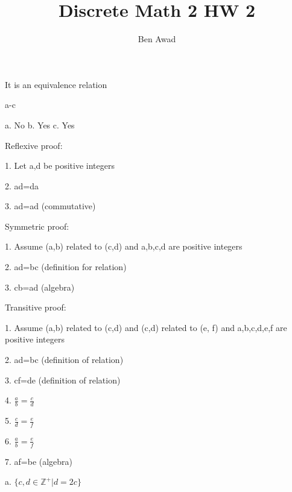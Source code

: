 \documentclass[12pt]{article}
\newenvironment{problem}[2][Problem]{\begin{trivlist}
\item[\hskip \labelsep {\bfseries #1}\hskip \labelsep {\bfseries #2.}]}{\end{trivlist}}
\begin{document}
 
 
\title{Discrete Math 2 HW 2}
\author{Ben Awad}
\maketitle
 
\begin{problem}{9.5.22}
\end{problem}
It is an equivalence relation

\begin{problem}{9.5.24}
    a-c
\end{problem}

a. No
b. Yes
c. Yes

\begin{problem}{9.5.16}
\end{problem}

Reflexive proof:

1. Let a,d be positive integers

2. ad=da

3. ad=ad (commutative)

Symmetric proof:

1. Assume (a,b) related to (c,d) and a,b,c,d are positive integers

2. ad=bc (definition for relation)

3. cb=ad (algebra)

Transitive proof:

1. Assume (a,b) related to (c,d) and (c,d) related to (e, f) and a,b,c,d,e,f are positive integers

2. ad=bc (definition of relation)

3. cf=de (definition of relation)

4. $\frac{a}{b} = \frac{c}{d}$

5. $\frac{c}{d} = \frac{e}{f}$

6. $\frac{a}{b} = \frac{e}{f}$

7. af=be (algebra)

\begin{problem}{9.5.40}
\end{problem}
a. $\{ c,d \in \mathbb{Z}^+ | d=2c \}$

\begin{problem}{Let R and S be relations on the set...}
\end{problem}
\end{document}
